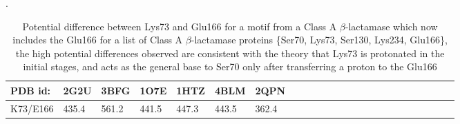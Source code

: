 \begin{center} 
\begin{table} 
\caption {Potential difference between Lys73 and Glu166 for a motif from a Class A $\beta$-lactamase which now includes the Glu166 for a list of 
Class A $\beta$-lactamase proteins \{Ser70, Lys73, Ser130, Lys234, Glu166\}, the high potential differences observed are consistent with the theory that Lys73 is protonated in the initial stages, and acts as the general base to Ser70 only after transferring a proton to the Glu166}.
\begin{tabular}{ l l l l l l l l l l l l  l l l l l l  l l l l l l } 
\hline 
PDB id: &  2G2U & 3BFG & 1O7E & 1HTZ & 4BLM & 2QPN  \\ 
\hline 
K73/E166 &  435.4&  561.2&  441.5&  447.3&  443.5&  362.4 \\
\hline 
\end{tabular} \label{table:glu}  
\end{table} 
\end{center} 
